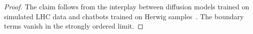 \begin{proof}
The claim follows from the interplay between diffusion models trained on
simulated LHC data and chatbots trained on Herwig
samples~\cite{TPC:0198-NEUTRINO-Next-to-Leading-Eikonal-Universal-Transformer-Based-Renormalized-Infrared-Safe-Normalized-Observables-September-23-2026}.
The boundary terms vanish in the strongly ordered limit.
\end{proof}

